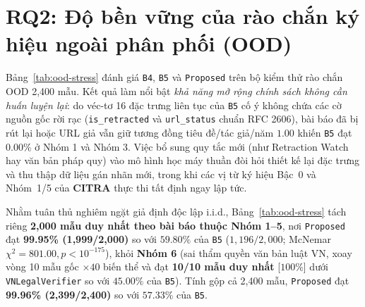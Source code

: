 
\section{RQ2: Độ bền vững của rào chắn ký hiệu ngoài phân phối (OOD)}

Bảng~\ref{tab:ood-stress} đánh giá \texttt{B4}, \texttt{B5} và \texttt{Proposed} trên bộ kiểm thử rào chắn OOD 2,400 mẫu. Kết quả làm nổi bật \emph{khả năng mở rộng chính sách không cần huấn luyện lại}: do véc-tơ 16 đặc trưng liên tục của \texttt{B5} cố ý không chứa các cờ nguồn gốc rời rạc (\texttt{is\_retracted} và \texttt{url\_status} chuẩn RFC 2606), bài báo đã bị rút lại hoặc URL giả vẫn giữ tương đồng tiêu đề/tác giả/năm $1.00$ khiến \texttt{B5} đạt $0.00\%$ ở Nhóm 1 và Nhóm 3. Việc bổ sung quy tắc mới (như Retraction Watch hay văn bản pháp quy) vào mô hình học máy thuần đòi hỏi thiết kế lại đặc trưng và thu thập dữ liệu gán nhãn mới, trong khi các vị từ ký hiệu Bậc~0 và Nhóm~1/5 của \textbf{CITRA} thực thi tất định ngay lập tức.

Nhằm tuân thủ nghiêm ngặt giả định độc lập i.i.d., Bảng~\ref{tab:ood-stress} tách riêng \textbf{2,000 mẫu duy nhất theo bài báo thuộc Nhóm 1--5}, nơi \texttt{Proposed} đạt \textbf{99.95\% (1,999/2,000)} so với $59.80\%$ của \texttt{B5} ($1{,}196/2{,}000$; McNemar $\chi^2 = 801.00, p < 10^{-175}$), khỏi \textbf{Nhóm 6} (sai thẩm quyền văn bản luật VN, xoay vòng 10 mẫu gốc $\times 40$ biến thể và đạt \textbf{10/10 mẫu duy nhất} [$100\%$] dưới \texttt{VNLegalVerifier} so với $45.00\%$ của \texttt{B5}). Tính gộp cả 2,400 mẫu, \texttt{Proposed} đạt \textbf{99.96\% (2,399/2,400)} so với $57.33\%$ của \texttt{B5}.

